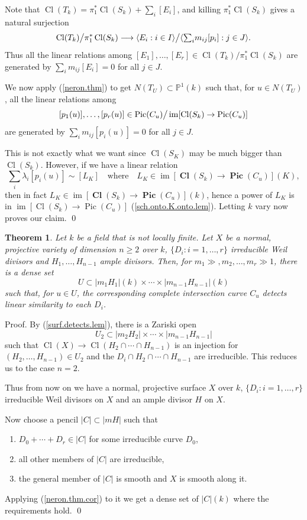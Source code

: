 \documentclass{amsart}
\newtheorem{thm}{Theorem}%
\theoremstyle{definition}
\theoremstyle{remark}
\newcommand{\p}[0]{{\mathbb P}}
\newcommand{\qtq}[1]{\quad\mbox{#1}\quad}
\newcommand{\pic}[0]{\operatorname{Pic}}
\newcommand{\pics}[0]{\operatorname{\mathbf{Pic}}}
\newcommand{\im}[0]{\operatorname{im}}
\newcommand{\cl}[0]{\operatorname{Cl}}
\newcommand{\cls}[0]{\operatorname{\mathbf{Cl}}}
\newcommand{\tsum}[0]{\textstyle{\sum}}
\begin{document}
Note that $\cl(T_k)=\pi_1^*\cl(S_k)+\tsum_i[E_i]$, and killing 
$\pi_1^*\cl(S_k) $ gives  a natural surjection
$$
\cl(T_k)\bigr\slash \pi_1^*\cl(S_k)
\longrightarrow
\langle E_i:i\in I\rangle\bigr\slash\langle \tsum_i m_{ij}[p_i]:j\in J\rangle.
$$
Thus all the linear relations among 
 $[E_1], \dots, [E_r] \in \cl(T_k)/\pi_1^*\cl(S_k)$
are generated by
$\tsum_i m_{ij}[E_i]=0$ for all $j\in J$.

We now apply (\ref{neron.thm}) to get $N(T_U)\subset \p^1(k)$
such that, for $u\in N(T_U)$,  all the linear relations among 
 $$[ p_1(u)], \dots, [ p_r(u)]\in 
\pic(C_u)\bigr\slash\im[\cl(S_k)\to \pic(C_u)]$$ 
are generated by
$\tsum_i m_{ij}[ p_i(u)]=0$ for all $j\in J$.

This is not exactly what we want since $\cl(S_K)$ may be much bigger than
$\cl(S_k)$. However, if we have a linear relation
$$
\tsum_i \lambda_i[ p_i(u)]\sim [L_K]\qtq{where} L_K\in \im[\cls(S_k)\to \pics(C_u)](K),
$$
then in fact $L_K\in \im[\cls(S_k)\to \pics(C_u)](k)$, hence a power of $L_K$ is
in $\im[\cl(S_k)\to \pic(C_u)]$  (\ref{sch.onto.K.onto.lem}).  Letting $k$ vary now proves our claim. \qed





\begin{thm}\label{ner.for.ci.thm}
 Let $k$ be a field that is not locally  finite. Let
$X$ be a normal, projective variety of dimension $n\geq 2$ over $k$, $\{D_i:i=1,\dots, r\}$  irreducible Weil divisors and $H_1, \dots, H_{n-1}$  ample divisors. Then, for $m_1\gg, m_2,\dots, m_r\gg  1$, there is a dense set
$$
U\subset |m_1H_1|(k)\times\cdots\times |m_{n-1}H_{n-1}|(k)
$$ such that, for $u\in U$, the corresponding
complete intersection curve $C_u$ detects  linear similarity to each $D_i$.
\end{thm}



Proof.   By (\ref{surf.detects.lem}), there is a Zariski open 
$$
U_2\subset |m_2H_2|\times\cdots\times |m_{n-1}H_{n-1}|
$$
such that  $\cl(X)\to \cl(H_2\cap \cdots\cap H_{n-1})$ is an injection for
$(H_2, \dots, H_{n-1})\in U_2$ and the $D_i\cap H_2\cap \cdots\cap H_{n-1}$ are irreducible.   This reduces us  to the case $n=2$. 

Thus from now on we have  a normal, projective surface $X$ over $k$, $\{D_i:i=1,\dots, r\}$  irreducible Weil divisors on $X$ and  an ample divisor $H$ on $X$.

Now choose  a pencil $|C|\subset |mH|$ such that 
\begin{enumerate}
\item $D_0+\cdots+D_r\in |C|$ for some irreducible curve $D_0$,
\item all other members of $|C|$ are irreducible,
\item the general member of $|C|$ is smooth and $X$ is smooth along it.
\end{enumerate}
Applying (\ref{neron.thm.cor}) to it we get a dense set of $|C|(k)$ where
the requirements hold. \qed
\medskip
\end{document}
